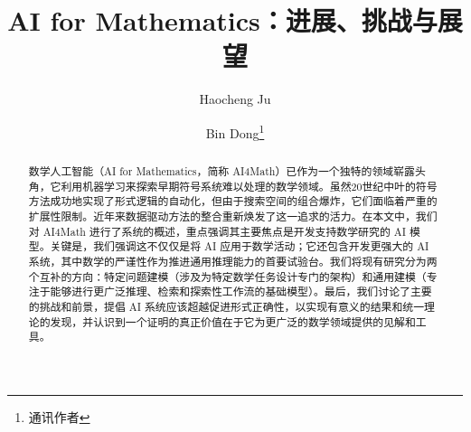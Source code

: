 \documentclass[11pt]{article}
\numberwithin{equation}{section}
\begin{document}
\title{AI for Mathematics：进展、挑战与展望}





\author[1]{Haocheng Ju}
\author[2,3,4,5]{Bin Dong\thanks{通讯作者}}


\maketitle



 {\begin{center}
\parbox{14.5cm}{\begin{abstract}
数学人工智能（AI for Mathematics，简称 AI4Math）已作为一个独特的领域崭露头角，它利用机器学习来探索早期符号系统难以处理的数学领域。虽然20世纪中叶的符号方法成功地实现了形式逻辑的自动化，但由于搜索空间的组合爆炸，它们面临着严重的扩展性限制。近年来数据驱动方法的整合重新焕发了这一追求的活力。在本文中，我们对 AI4Math 进行了系统的概述，重点强调其主要焦点是开发支持数学研究的 AI 模型。关键是，我们强调这不仅仅是将 AI 应用于数学活动；它还包含开发更强大的 AI 系统，其中数学的严谨性作为推进通用推理能力的首要试验台。我们将现有研究分为两个互补的方向：特定问题建模（涉及为特定数学任务设计专门的架构）和通用建模（专注于能够进行更广泛推理、检索和探索性工作流的基础模型）。最后，我们讨论了主要的挑战和前景，提倡 AI 系统应该超越促进形式正确性，以实现有意义的结果和统一理论的发现，并认识到一个证明的真正价值在于它为更广泛的数学领域提供的见解和工具。
 
\end{abstract}}\end{center}}





\end{document}
